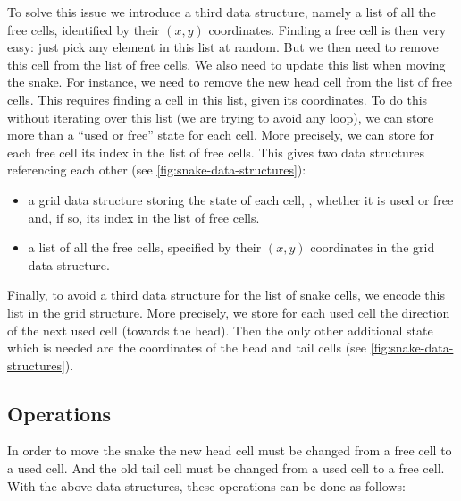 To solve this issue we introduce a third data structure, namely a list of all
the free cells, identified by their $(x,y)$ coordinates. Finding a free cell is
then very easy: just pick any element in this list at random. But we then need
to remove this cell from the list of free cells. We also need to update this
list when moving the snake. For instance, we need to remove the new head cell
from the list of free cells. This requires finding a cell in this list, given
its coordinates. To do this without iterating over this list (we are trying to
avoid any loop), we can store more than a ``used or free'' state for each cell.
More precisely, we can store for each free cell its index in the list of free
cells. This gives two data structures referencing each other (see
\cref{fig:snake-data-structures}):
\begin{itemize}
  \item a grid data structure storing the state of each cell, \ie, whether it
  is used or free and, if so, its index in the list of free cells.

  \item a list of all the free cells, specified by their $(x,y)$ coordinates in
  the grid data structure.
\end{itemize}

Finally, to avoid a third data structure for the list of snake cells, we encode
this list in the grid structure. More precisely, we store for each used cell
the direction of the next used cell (towards the head). Then the only other
additional state which is needed are the coordinates of the head and tail cells
(see \cref{fig:snake-data-structures}).

\subsection{Operations}\label{subsection:snake-operations}

In order to move the snake the new head cell must be changed from a free cell
to a used cell. And the old tail cell must be changed from a used cell to a
free cell. With the above data structures, these operations can be done as
follows:

